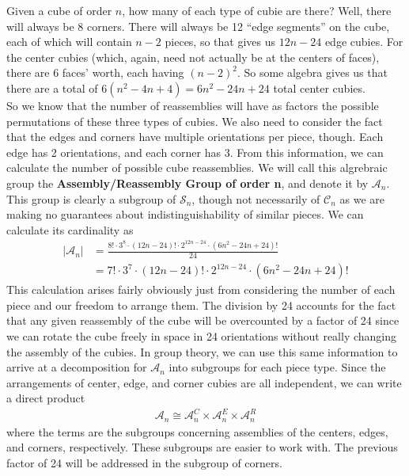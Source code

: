 \documentclass[10pt,letterpaper]{report}
\begin{document}
Given a cube of order $n$, how many of each type of cubie are there?  Well, there will always be 8 corners.  There will always be 12 ``edge segments'' on the cube, each of which will contain $n-2$ pieces, so that gives us $12n - 24$ edge cubies.  For the center cubies (which, again, need not actually be at the centers of faces), there are 6 faces' worth, each having $(n-2)^2$.  So some algebra gives us that there are a total of $6(n^2  - 4n + 4) = 6n^2 - 24n + 24$ total center cubies. \\

So we know that the number of reassemblies will have as factors the possible permutations of these three types of cubies.  We also need to consider the fact that the edges and corners have multiple orientations per piece, though.  Each edge has 2 orientations, and each corner has 3.  From this information, we can calculate the number of possible cube reassemblies.  We will call this algrebraic group the \textbf{Assembly/Reassembly Group of order n}, and denote it by $\mathcal{A}_n$.  This group is clearly a subgroup of $\mathcal{S}_n$, though not necessarily of $\mathcal{C}_n$ as we are making no guarantees about indistinguishability of similar pieces.  We can calculate its cardinality as \begin{align*}
|\mathcal{A}_n| &= \frac{8! \cdot 3^8 \cdot (12n-24)! \cdot 2^{12n-24} \cdot (6n^2 - 24n + 24)!}{24} \\
&= 7! \cdot 3^7 \cdot (12n-24)! \cdot 2^{12n-24} \cdot (6n^2 - 24n + 24)!
\end{align*}
This calculation arises fairly obviously just from considering the number of each piece and our freedom to arrange them.  The division by 24 accounts for the fact that any given reassembly of the cube will be overcounted by a factor of 24 since we can rotate the cube freely in space in 24 orientations without really changing the assembly of the cubies.  In group theory, we can use this same information to arrive at a decomposition for $\mathcal{A}_n$ into subgroups for each piece type.  Since the arrangements of center, edge, and corner cubies are all independent, we can write a direct product
\begin{align*}
\mathcal{A}_n \cong
\mathcal{A}_n^C \times
\mathcal{A}_n^E \times
\mathcal{A}_n^R
\end{align*}
where the terms are the subgroups concerning assemblies of the centers, edges, and corners, respectively.  These subgroups are easier to work with.  The previous factor of 24 will be addressed in the subgroup of corners. \\
\end{document}
